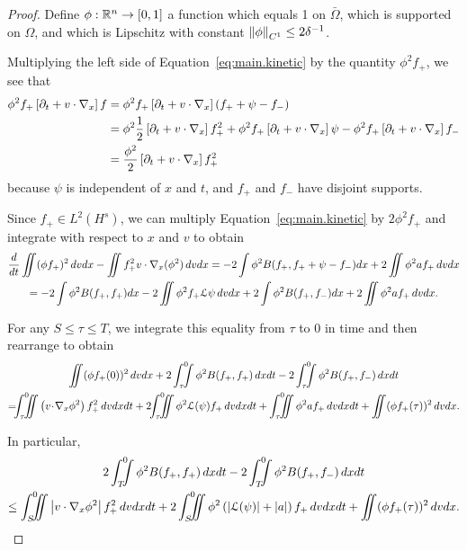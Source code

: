 \begin{proof}
Define $\phi:\mathbb{R}^n \to [0,1]$ a function which equals 1 on $\bar{\Omega}$, which is supported on $\Omega$, and which is Lipschitz with constant $\left\lVert\phi\right\rVert_{C^1} \leq 2 \delta^{-1}$.  

Multiplying the left side of Equation~\eqref{eq:main.kinetic} by the quantity $\phi^2 f_+$, we see that
\begin{align*}
\phi^2 f_+ \left[ \partial_t + v\cdot \nabla_x \right] f &= \phi^2 f_+ \left[ \partial_t + v\cdot \nabla_x \right](f_++\psi-f_-)
\\ &= \phi^2\frac{1}{2} \left[ \partial_t + v\cdot \nabla_x \right] f_+^2 + \phi^2 f_+ \left[ \partial_t + v\cdot \nabla_x \right] \psi - \phi^2 f_+ \left[ \partial_t + v\cdot \nabla_x \right] f_-
\\ &= \frac{\phi^2}{2} \left[ \partial_t + v\cdot \nabla_x \right] f_+^2
\end{align*}
because $\psi$ is independent of $x$ and $t$, and $f_+$ and $f_-$ have disjoint supports.  

Since $f_+ \in L^2(H^s)$, we can multiply Equation~\eqref{eq:main.kinetic} by $2 \phi^2 f_+$ and integrate with respect to $x$ and $v$ to obtain
\begin{multline*}
\frac{d}{dt} \iint (\phi f_+)^2 \,dvdx - \iint f_+^2 v\cdot\nabla_x(\phi^2) \,dvdx = -2 \int \phi^2 B(f_+, f_+ + \psi - f_-) dx + 2 \iint \phi^2 a f_+ \,dvdx
\\ = -2 \int \phi^2 B(f_+, f_+) dx - 2 \iint \phi^2 f_+ \mathcal{L}\psi \,dvdx + 2 \int \phi^2 B(f_+, f_-) dx + 2 \iint \phi^2 a f_+ \,dvdx.
\end{multline*}

For any $S \leq \tau \leq T$, we integrate this equality from $\tau$ to $0$ in time and then rearrange to obtain
\begin{multline*} 
\iint (\phi f_+(0))^2 \,dvdx + 2\int_\tau^0\!\!\!\!\int \phi^2 B(f_+,f_+) \,dxdt - 2\int_\tau^0\!\!\!\!\int \phi^2 B(f_+,f_-) \,dxdt \\
=\!\!\! \int_\tau^0\!\!\!\!\iint \paren{v\!\cdot\!\grad_x \phi^2} f_+^2 \,dvdxdt + 2\!\!\int_\tau^0\!\!\!\!\iint \phi^2 {\L(\psi)} f_+ \,dvdxdt + \int_\tau^0\!\!\!\!\iint \phi^2 a f_+ \,dvdxdt + \iint (\phi f_+(\tau))^2 \,dvdx. 
\end{multline*}

In particular,
\begin{multline*} 
2\int_T^0\!\!\!\!\int \phi^2 B(f_+,f_+) \,dxdt - 2\int_T^0\!\!\!\!\int \phi^2 B(f_+,f_-) \,dxdt \\
\leq \int_S^0\!\!\!\!\iint \abs{v\cdot\grad_x \phi^2} f_+^2 \,dvdxdt + 2\int_S^0\!\!\!\!\iint \phi^2 \paren{\abs{\L(\psi)}+|a|} f_+ \,dvdxdt + \iint (\phi f_+(\tau))^2 \,dvdx. 
\end{multline*}


\end{proof}
